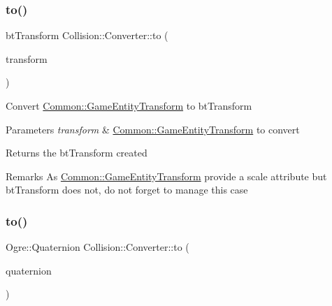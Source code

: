 \subsubsection{\texorpdfstring{to()}{to()}\hspace{0.1cm}{\footnotesize\ttfamily [2/6]}}
{\footnotesize\ttfamily bt\+Transform Collision\+::\+Converter\+::to (\begin{DoxyParamCaption}\item[{const \hyperlink{struct_common_1_1_game_entity_transform}{Common\+::\+Game\+Entity\+Transform} \&}]{transform }\end{DoxyParamCaption})\hspace{0.3cm}{\ttfamily [static]}}

Convert \hyperlink{struct_common_1_1_game_entity_transform}{Common\+::\+Game\+Entity\+Transform} to bt\+Transform 
\begin{DoxyParams}{Parameters}
{\em transform} & \hyperlink{struct_common_1_1_game_entity_transform}{Common\+::\+Game\+Entity\+Transform} to convert \\
\hline
\end{DoxyParams}
\begin{DoxyReturn}{Returns}
the bt\+Transform created 
\end{DoxyReturn}
\begin{DoxyRemark}{Remarks}
As \hyperlink{struct_common_1_1_game_entity_transform}{Common\+::\+Game\+Entity\+Transform} provide a scale attribute but bt\+Transform does not, do not forget to manage this case 
\end{DoxyRemark}
\mbox{\label{class_collision_1_1_converter_a303519e4c318cca485ca02399b6a1ed3}} 
\subsubsection{\texorpdfstring{to()}{to()}\hspace{0.1cm}{\footnotesize\ttfamily [3/6]}}
{\footnotesize\ttfamily Ogre\+::\+Quaternion Collision\+::\+Converter\+::to (\begin{DoxyParamCaption}\item[{const bt\+Quaternion \&}]{quaternion }\end{DoxyParamCaption})\hspace{0.3cm}{\ttfamily [static]}}

